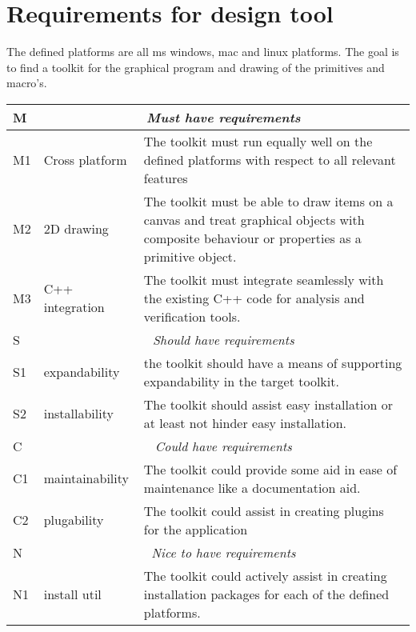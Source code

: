 \section{Requirements for design tool}

The defined platforms are all ms windows, mac and linux platforms. The goal is to find a
toolkit for the graphical program and drawing of the primitives and macro's.

\begin{center}
    \label{fig: risico}
    \sf
    \small\sf
    \begin{tabular}{|l|p{7em}|p{23em}|}
	\hline
	M	& \multicolumn{2}{c|}{\sf\emph{\large Must have requirements}}
		\\\hline
	M1	& Cross platform & The toolkit must run equally well on the
				    defined platforms with respect to all relevant features
		\\\hline
	M2	& 2D drawing & The toolkit must be able to draw items on a
				canvas and treat graphical objects with composite
				behaviour or properties as a primitive object.
		\\\hline
	M3	& C++ integration & The toolkit must integrate seamlessly with
				the existing C++ code for analysis and verification tools.
		\\\hline
	S	& \multicolumn{2}{c|}{\sf\emph{\large Should have requirements}}
		\\\hline
	S1	& expandability & the toolkit should have a means of supporting expandability
				    in the target toolkit.
		\\\hline
	S2	& installability & The toolkit should assist easy installation or at least not
				    hinder easy installation.
		\\\hline
	C	& \multicolumn{2}{c|}{\sf\emph{\large Could have requirements}}
		\\\hline
	C1	& maintainability & The toolkit could provide some aid in ease of maintenance
				    like a documentation aid.
		\\\hline
	C2	& plugability	& The toolkit could assist in creating plugins for the application
		\\\hline
	N	& \multicolumn{2}{c|}{\sf\emph{\large Nice to have requirements}}
		\\\hline
	N1	& install util	& The toolkit could actively assist in creating installation
				    packages for each of the defined platforms.
		\\\hline
    \end{tabular}
\end{center}


